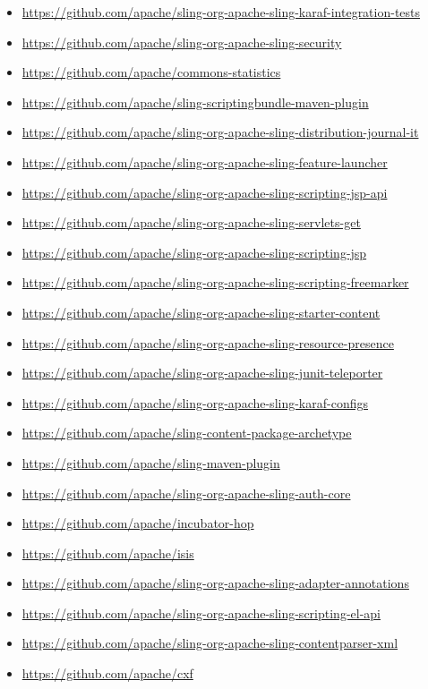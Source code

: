 \documentclass[sigconf]{acmart}
\begin{document}
\begin{itemize}
  \item \url{https://github.com/apache/sling-org-apache-sling-karaf-integration-tests}
  \item \url{https://github.com/apache/sling-org-apache-sling-security}
  \item \url{https://github.com/apache/commons-statistics}
  \item \url{https://github.com/apache/sling-scriptingbundle-maven-plugin}
  \item \url{https://github.com/apache/sling-org-apache-sling-distribution-journal-it}
  \item \url{https://github.com/apache/sling-org-apache-sling-feature-launcher}
  \item \url{https://github.com/apache/sling-org-apache-sling-scripting-jsp-api}
  \item \url{https://github.com/apache/sling-org-apache-sling-servlets-get}
  \item \url{https://github.com/apache/sling-org-apache-sling-scripting-jsp}
  \item \url{https://github.com/apache/sling-org-apache-sling-scripting-freemarker}
  \item \url{https://github.com/apache/sling-org-apache-sling-starter-content}
  \item \url{https://github.com/apache/sling-org-apache-sling-resource-presence}
  \item \url{https://github.com/apache/sling-org-apache-sling-junit-teleporter}
  \item \url{https://github.com/apache/sling-org-apache-sling-karaf-configs}
  \item \url{https://github.com/apache/sling-content-package-archetype}
  \item \url{https://github.com/apache/sling-maven-plugin}
  \item \url{https://github.com/apache/sling-org-apache-sling-auth-core}
  \item \url{https://github.com/apache/incubator-hop}
  \item \url{https://github.com/apache/isis}
  \item \url{https://github.com/apache/sling-org-apache-sling-adapter-annotations}
  \item \url{https://github.com/apache/sling-org-apache-sling-scripting-el-api}
  \item \url{https://github.com/apache/sling-org-apache-sling-contentparser-xml}
  \item \url{https://github.com/apache/cxf}

\end{itemize}
\end{document}
